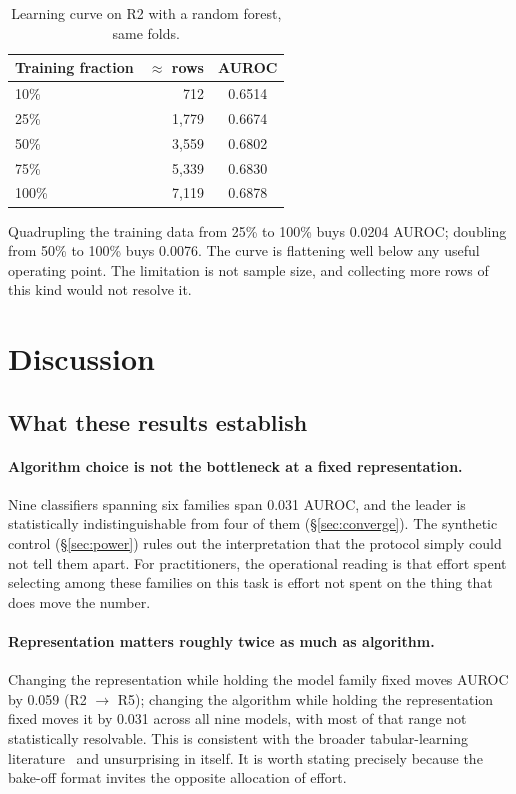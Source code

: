 \documentclass[11pt]{article}                      %
\newcommand{\tabfont}{\footnotesize}
\begin{document}
\begin{table}[h]
\centering\tabfont
\caption{Learning curve on R2 with a random forest, same folds.}
\label{tab:curve}
\begin{tabular}{lrc}
\toprule
Training fraction & $\approx$ rows & AUROC \\
\midrule
10\%  &   712 & 0.6514 \\
25\%  & 1{,}779 & 0.6674 \\
50\%  & 3{,}559 & 0.6802 \\
75\%  & 5{,}339 & 0.6830 \\
100\% & 7{,}119 & 0.6878 \\
\bottomrule
\end{tabular}
\end{table}

Quadrupling the training data from 25\% to 100\% buys 0.0204 AUROC; doubling from
50\% to 100\% buys 0.0076. The curve is flattening well below any useful
operating point. The limitation is not sample size, and collecting more rows of
this kind would not resolve it.

\section{Discussion}

\subsection{What these results establish}

\paragraph{Algorithm choice is not the bottleneck at a fixed representation.}
Nine classifiers spanning six families span 0.031 AUROC, and the leader is
statistically indistinguishable from four of them (\S\ref{sec:converge}). The
synthetic control (\S\ref{sec:power}) rules out the interpretation that the
protocol simply could not tell them apart. For practitioners, the operational
reading is that effort spent selecting among these families on this task is
effort not spent on the thing that does move the number.

\paragraph{Representation matters roughly twice as much as algorithm.}
Changing the representation while holding the model family fixed moves AUROC by
0.059 (R2 $\rightarrow$ R5); changing the algorithm while holding the
representation fixed moves it by 0.031 across all nine models, with most of that
range not statistically resolvable. This is consistent with the broader
tabular-learning literature~\cite{grinsztajn2022tabular} and unsurprising in
itself. It is worth stating precisely because the bake-off format invites the
opposite allocation of effort.
\end{document}
